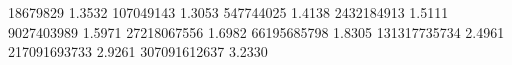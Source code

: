 18679829     1.3532 %
107049143    1.3053 %
547744025    1.4138 %
2432184913   1.5111 %
9027403989   1.5971 %
27218067556  1.6982 %
66195685798  1.8305 %
131317735734 2.4961 %
217091693733 2.9261 %
307091612637 3.2330 %
